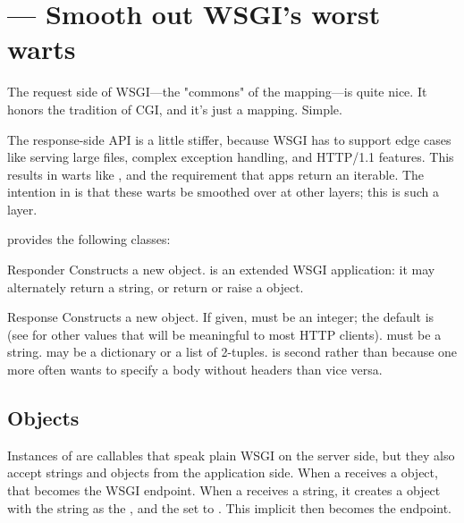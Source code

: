 \section{ ---
         Smooth out WSGI's worst warts}



The request side of WSGI---the "commons" of the  mapping---is quite
nice. It honors the tradition of CGI, and it's just a mapping. Simple.

The response-side API is a little stiffer, because WSGI has to support edge
cases like serving large files, complex exception handling, and HTTP/1.1
features. This results in warts like , and the requirement
that apps return an iterable. The intention in  is that these warts be smoothed
over at other layers; this is such a layer.

 provides the following classes:

\begin{classdesc}{Responder}{}
Constructs a new  object.  is an extended WSGI
application: it may alternately return a string, or return or raise a
 object.
\end{classdesc}

\begin{classdesc}{Response}{  }
Constructs a new  object. If given,  must be an
integer; the default is
(see  for other values
that will be meaningful to most HTTP clients).  must be a string.
 may be a dictionary or a list of 2-tuples.  is second
rather than  because one more often wants to specify a body without
headers than vice versa.
\end{classdesc}


\subsection{ Objects \label{responder}}

Instances of  are callables that speak plain WSGI on the
server side, but they also accept strings and  objects from the
application side. When a  receives a  object,
that becomes the WSGI endpoint. When a  receives a string, it
creates a  object with the string as the , and the
 set to . This implicit
 then becomes the endpoint.


